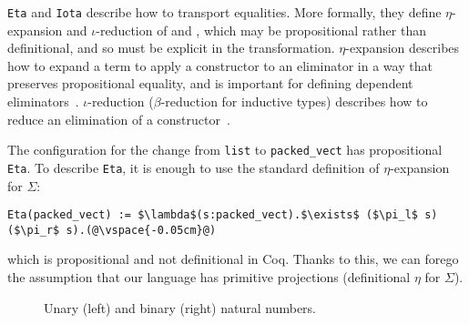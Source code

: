 \lstinline{Eta} and \lstinline{Iota} describe how to transport equalities.
More formally, they define $\eta$-expansion and $\iota$-reduction of \A and \B,
which may be propositional rather than definitional, and so must be explicit in the transformation.
$\eta$-expansion describes how to expand a term to apply a constructor to an eliminator in a way that preserves propositional equality,
and is important for defining dependent eliminators~\cite{nlab:eta-conversion}.
$\iota$-reduction ($\beta$-reduction for inductive types) describes how to reduce an elimination of a constructor~\cite{nlab:beta-reduction}.

The configuration for the change from \lstinline{list} to \lstinline{packed_vect} has propositional \lstinline{Eta}.
To describe \lstinline{Eta}, it is enough to use the standard definition of $\eta$-expansion for $\Sigma$:

\begin{lstlisting}
Eta(packed_vect) := $\lambda$(s:packed_vect).$\exists$ ($\pi_l$ s) ($\pi_r$ s).(@\vspace{-0.05cm}@)
\end{lstlisting}
which is propositional and not definitional in Coq.
Thanks to this, we can forego the assumption that our language has primitive projections (definitional $\eta$ for $\Sigma$).

\begin{figure}
\begin{minipage}{0.44\columnwidth}
   
\end{minipage}
\hfill
\begin{minipage}{0.54\columnwidth}
   
\end{minipage}
\vspace{-0.4cm}
\caption{Unary (left) and binary (right) natural numbers.}
\label{fig:nattobin}
\end{figure}

